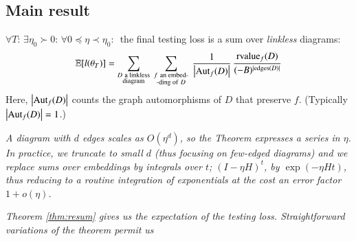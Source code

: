 {        \subsection{Main result}\label{sect:main}
    

            \begin{thm} \label{thm:resum}
                $\forall T:\, \exists \eta_0 \succ 0:\,
                \forall 0\preceq \eta \prec \eta_0:\,$
                the final testing loss is
                a sum over \emph{linkless} diagrams: 
                    \squash
                \begin{equation*} \label{eq:resum}
                    \expc[l(\theta_T)]=
                    \sum_{\substack{D~\text{a linkless} \\ \text{diagram}}}
                    ~
                    \sum_{\substack{f~\text{an embed-} \\ \text{-ding of}~D}}
                    ~
                    \frac{1}{\wabs{\Aut_f(D)}}
                    \,
                    \frac{{\rvalue_f}(D)}{(-B)^{|\edges(D)|}}
                    \squash
                \end{equation*}
                Here, $\left|\text{\textnormal{Aut}}_f(D)\right|$ counts the graph automorphisms of $D$
                that preserve $f$. (Typically $\left|\text{\textnormal{Aut}}_f(D)\right|=1$.)%
            \end{thm}
            \begin{rmk} \label{rmk:integrate}
                \emph{
                A diagram with $d$ edges scales as
                $O(\eta^d)$, so the Theorem expresses a series in $\eta$.  In
                practice, we truncate to small $d$ (thus focusing on few-edged
                diagrams) and we replace sums over embeddings by integrals over
                $t$; $(I-\eta H)^t$, by $\exp(- \eta H t)$, thus reducing to a
                routine integration of exponentials at the cost an error factor
                $1 + o(\eta)$.}\mend
            \end{rmk}
            \begin{rmk}
                \emph{Theorem \ref{thm:resum} gives us the expectation of 
                the testing loss.  Straightforward variations of the theorem permit us
}
\end{rmk}}
